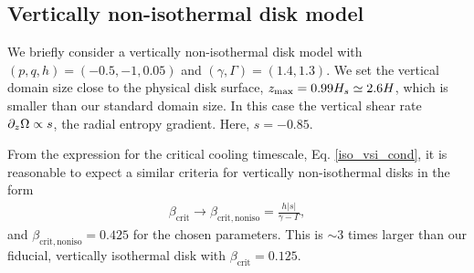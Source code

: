 %
%





\subsection{Vertically non-isothermal disk model} 
We briefly consider a vertically non-isothermal disk model with
$(p,q, h)=(-0.5,-1,0.05)$ and $(\gamma, \Gamma)=(1.4,1.3)$. We set the
vertical domain size close to the physical disk surface, $z_\mathrm{max} =
0.99H_s\simeq 2.6H$, which is smaller than our standard domain
size. In this case the vertical shear rate $\partial_z\Omega\propto s$, the
radial entropy gradient. Here, $s=-0.85$. 

From the expression for the
critical cooling timescale, Eq. \ref{iso_vsi_cond}, it is reasonable
to expect a similar criteria for vertically non-isothermal 
disks in the form
\begin{align}\label{bcrit_noniso}
 \beta_\mathrm{crit}\to\beta_\mathrm{crit, noniso} =
 \frac{h|s|}{\gamma - \Gamma},
\end{align}
and $\beta_\mathrm{crit,noniso}=0.425$ for the chosen parameters. This
is $\sim 3$ times larger than our fiducial, vertically isothermal
disk with $\beta_\mathrm{crit}=0.125$. 

